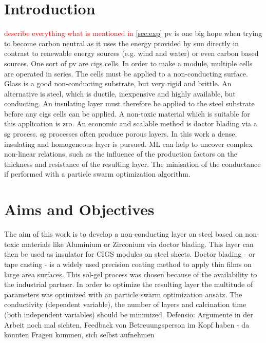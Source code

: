 \documentclass[a4paper]{article}
\newcommand{\td}[1]{\textcolor{red}{#1}}
\begin{document}
\section{Introduction}
\td{describe everything what is mentioned in \ref{sec:exp}}
\Gls{pv} is one big hope when trying to become carbon neutral as it uses the energy provided by sun directly in contrast to renewable energy sources (e.g. wind and water) or even carbon based sources.
One sort of \gls{pv} are \gls{cigs} \cite{Vasekar2010} cells. %
In order to make a module, multiple cells are operated in series. 
The cells must be applied to a non-conducting surface.
Glass is a good non-conducting substrate, but very rigid and brittle. 
An alternative is steel, which is ductile, inexpensive and highly available, but conducting. 
An insulating layer must therefore be applied to the steel substrate before any \gls{cigs} cells can be applied.
A non-toxic material which is suitable for this application is \gls{zro}. 
An economic and scalable method is doctor blading via a \gls{sg} process. 
\gls{sg} processes often produce porous layers. 
In this work a dense, insulating and homogeneous layer is pursued. 
ML can help to uncover complex non-linear relations, such as the influence of the production factors on the thickness and resistance of the resulting layer.
The minisation of the conductance if performed with a particle swarm optimization algorithm.
\section{Aims and Objectives}
The aim of this work is to develop a non-conducting layer on steel based on  non-toxic materials like Aluminium or Zirconium via doctor blading. 
This layer can then be used as insulator for CIGS modules on steel sheets.
Doctor blading - or tape casting - is a widely used precision coating method to apply thin films on large area surfaces\cite{Berni2004}.
This sol-gel process was chosen because of the availability to the industrial partner.
In order to optimize the resulting layer the multitude of parameters was optimized with an particle swarm optimization ansatz. %
The conductivity (dependent variable), the number of layers and calcination time (both independent variables) should be minimized.
\iffalse
Defensio: Argumente in der Arbeit noch mal sichten, Feedback von Betreuungsperson im Kopf haben - da könnten Fragen kommen, 
sich selbst aufnehmen 
\end{document}
